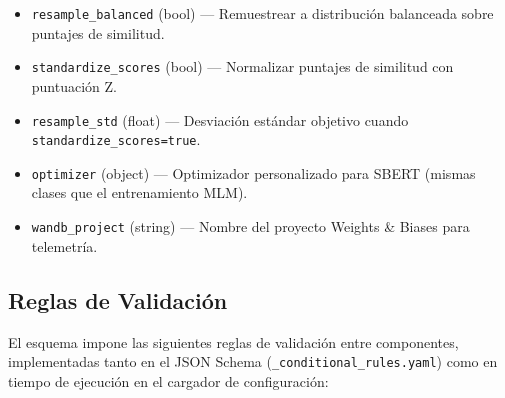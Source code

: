 \begin{itemize}[nosep]
    \item \texttt{resample\_balanced} (bool) --- Remuestrear a distribución balanceada sobre puntajes de similitud.
    \item \texttt{standardize\_scores} (bool) --- Normalizar puntajes de similitud con puntuación Z.
    \item \texttt{resample\_std} (float) --- Desviación estándar objetivo cuando \texttt{standardize\_scores=true}.
    \item \texttt{optimizer} (object) --- Optimizador personalizado para SBERT (mismas clases que el entrenamiento MLM).
    \item \texttt{wandb\_project} (string) --- Nombre del proyecto Weights \& Biases para telemetría.
\end{itemize}

\subsection{Reglas de Validación}

El esquema impone las siguientes reglas de validación entre componentes, implementadas tanto en el JSON Schema (\texttt{\_conditional\_rules.yaml}) como en tiempo de ejecución en el cargador de configuración:

